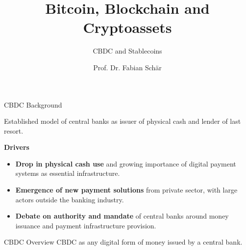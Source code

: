 \documentclass[handout]{beamer}
\title{Bitcoin, Blockchain and Cryptoassets}
\subtitle{CBDC and Stablecoins}
\author{Prof. Dr. Fabian Schär}
\institute{University of Basel}
\begin{document}
\thispagestyle{empty}
\begin{frame}[noframenumbering]
	\titlepage
\end{frame}


\begin{frame}{CBDC Background}

Established model of central banks as issuer of physical cash and lender of last resort.
\vspace{1.5em}	

\textbf{Drivers}
\begin{itemize}
	\item \textbf{Drop in physical cash use} and growing importance of digital payment systems as essential infrastructure.
	\item \textbf{Emergence of new payment solutions} from private sector, with large actors outside the banking industry.
	\item \textbf{Debate on authority and mandate} of central banks around money issuance and payment infrastructure provision.
\end{itemize}

\end{frame}


\begin{frame}{CBDC Overview}
CBDC as any \color{focus} digital form of money issued by a central bank. \color{black} 

\begin{center}
	\begin{tikzpicture}[scale=0.4, every node/.style ={scale=0.8}]
		
	\end{tikzpicture}
\end{center}



\end{frame}
\end{document}
